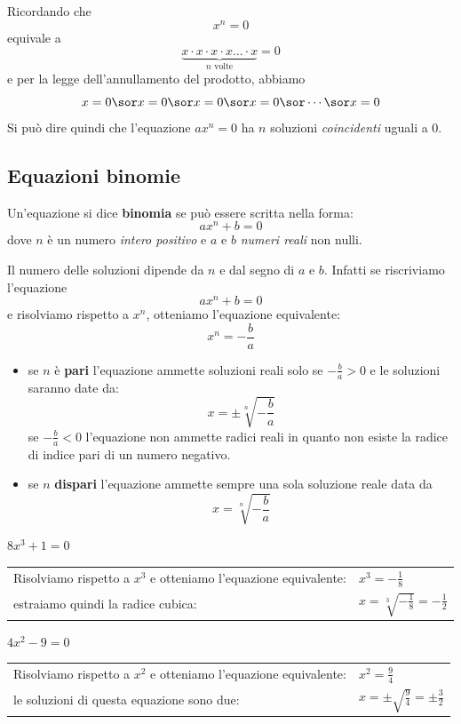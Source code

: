 Ricordando che $$x^n=0$$
equivale a $$\underbrace{x\cdot x\cdot x\cdot x \dots \cdot x}_{\text{$n$ 
volte}}=0$$
e per la legge dell'annullamento del prodotto, abbiamo $$x=0 \sor x=0 
\sor x=0 \sor x=0 \sor \cdots \sor x=0 $$
Si può dire quindi che l'equazione $ax^n=0$ ha $n$ soluzioni 
\emph{coincidenti} uguali a 0.

\subsection{Equazioni binomie}

\begin{definizione}
Un'equazione si dice \textbf{binomia} se può essere scritta nella forma:
$$ax^n+b=0$$
dove $n$ è un numero \emph{intero positivo} e $a$ e $b$  \emph{numeri 
reali}  non nulli.  
\end{definizione}

Il numero delle soluzioni dipende da $n$ e dal segno di $a$ e $b$.
Infatti se riscriviamo l'equazione
$$ax^n+b=0$$
e risolviamo rispetto a $x^n$, otteniamo l'equazione equivalente:
$$x^n=-\frac{b}{a}$$

\begin{itemize}
\item se $n$ è \textbf{pari} l'equazione ammette soluzioni reali 
solo se  $-\frac{b}{a}>0$ e le soluzioni saranno date da:
$$x=\pm \sqrt[n]{-\frac{b}{a}}$$
se $-\frac{b}{a}<0$ l'equazione non ammette radici reali in 
quanto non esiste la radice di indice pari di un numero negativo.
\item se $n$ \textbf{dispari} l'equazione ammette sempre 
una sola soluzione reale data da  $$x= \sqrt[n]{-\frac{b}{a}}$$ 
\end{itemize}

\begin{esempio}
$8x^3+1=0$
\begin{center}
\begin{tabular}{ll}
Risolviamo rispetto a $x^3$ e otteniamo l'equazione equivalente: & 
$x^3=-\frac{1}{8}$\\
estraiamo quindi la radice cubica: & $x=\sqrt[3]{-\frac{1}{8}} = -\frac{1}{2}$
\end{tabular}
\end{center}
\end{esempio}

\begin{esempio}
$4x^2-9=0$
\begin{center}
\begin{tabular}{ll}
Risolviamo rispetto a $x^2$ e otteniamo l'equazione equivalente: & 
$x^2=\frac{9}{4}$\\
le soluzioni di questa equazione sono due: & 
$x=\pm \sqrt{\frac{9}{4}}=\pm\frac{3}{2}$
\end{tabular}
\end{center}
\end{esempio}    


